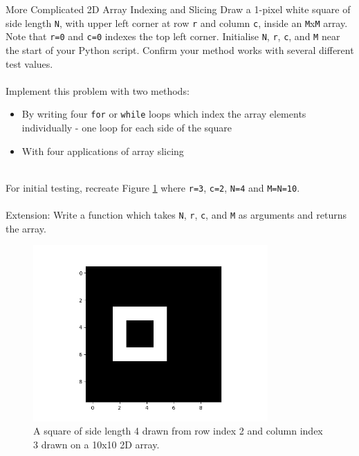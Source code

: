 \documentclass{lab}
\begin{document}
\begin{task}{More Complicated 2D Array Indexing and Slicing}{}
Draw a 1-pixel white square of side length \texttt{N}, with upper left corner at row \texttt{r} and column \texttt{c}, inside an \texttt{M}x\texttt{M} array. Note that \texttt{r=0} and \texttt{c=0} indexes the top left corner. Initialise \texttt{N}, \texttt{r}, \texttt{c}, and \texttt{M} near the start of your Python script. Confirm your method works with several different test values.
\\~\\
Implement this problem with two methods:
\begin{itemize}
	\item By writing four \texttt{for} or \texttt{while} loops which index the array elements individually - one loop for each side of the square
	\item With four applications of array slicing
\end{itemize}
~\\
For initial testing, recreate Figure \ref{fig:square} where \texttt{r=3}, \texttt{c=2}, \texttt{N=4} and \texttt{M=N=10}.
\\~\\
Extension: Write a function which takes \texttt{N}, \texttt{r}, \texttt{c}, and \texttt{M} as arguments and returns the array.
\begin{figure}[H]
\begin{center}
\includegraphics[width=0.8\textwidth]{square.png}
\end{center}
\caption{A square of side length 4 drawn from row index 2 and column index 3 drawn on a 10x10 2D array.}\label{fig:square}
\end{figure}
\end{task}
\end{document}
